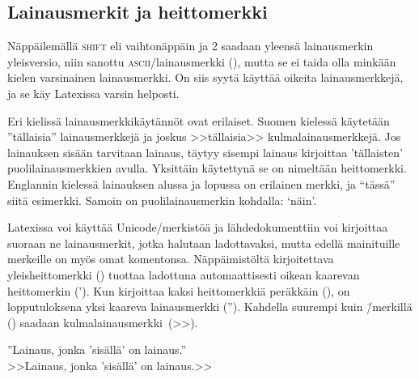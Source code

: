
\subsection{Lainausmerkit ja heittomerkki}
\label{luku:lainausmerkit}

Näppäilemällä \textsc{shift} eli vaihtonäppäin ja 2 saadaan yleensä
lainausmerkin yleisversio, niin sanottu \textsc{ascii}\-/lainausmerkki
(\textquotedbl), mutta se ei taida olla minkään kielen varsinainen
lainausmerkki. On siis syytä käyttää oikeita lainausmerkkejä, ja se käy
Latexissa varsin helposti.

Eri kielissä lainausmerkkikäytännöt ovat erilaiset. Suomen kielessä
käytetään ''tällaisia'' lainausmerkkejä ja joskus >>tällaisia>>
kulmalainausmerkkejä. Jos lainauksen sisään tarvitaan lainaus, täytyy
sisempi lainaus kirjoittaa 'tällaisten' puolilainausmerkkien avulla.
Yksittäin käytettynä se on nimeltään heittomerkki. Englannin kielessä
lainauksen alussa ja lopussa on erilainen merkki, ja ``tässä'' siitä
esimerkki. Samoin on puolilainausmerkin kohdalla: `näin'.

Latexissa voi käyttää Unicode\-/merkistöä ja lähdedokumenttiin voi
kirjoittaa suoraan ne lainausmerkit, jotka halutaan ladottavaksi, mutta
edellä mainituille merkeille on myös omat komentonsa. Näppäimistöltä
kirjoitettava yleisheittomerkki () tuottaa ladottuna
automaattisesti oikean kaarevan heittomerkin ('). Kun kirjoittaa kaksi
heittomerkkiä peräkkäin (), on lopputuloksena yksi kaareva
lainausmerkki (''). Kahdella suurempi kuin \=/merkillä (\koodi{>>})
saadaan kulmalainausmerkki~(>>).


\begin{koodilohkosis}
  ''Lainaus, jonka 'sisällä' on lainaus.'' \\
  >>Lainaus, jonka 'sisällä' on lainaus.>>
\end{koodilohkosis}

